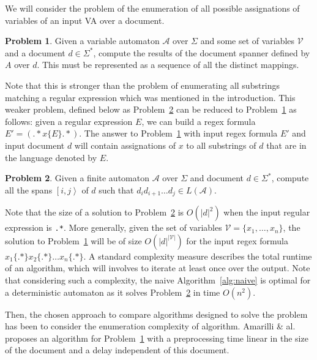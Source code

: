 \documentclass[12px]{article}
\theoremstyle{definition}
\newtheorem{problem}{Problem}
\newcommand{\Span}[1]{\left[ #1 \right\rangle}
\begin{document}

      We will consider the problem of the enumeration of all possible
      assignations of variables of an input VA over a document.

      \begin{problem}%
        \label{pb:strong}
        Given a variable automaton $\mathcal{A}$ over $\Sigma$ and some set of
        variables $\mathcal{V}$ and a document $d \in \Sigma^*$, compute the
        results of the document spanner defined by $A$ over $d$. This must be
        represented as a sequence of all the distinct mappings.
      \end{problem}

      Note that this is stronger than the problem of enumerating all substrings
      matching a regular expression which was mentioned in the introduction.
      This weaker problem, defined below as Problem~\ref{pb:weak} can be
      reduced to Problem~\ref{pb:strong} as follows: given a regular expression
      $E$, we can build a regex formula $E' = ({.}* x\{E\} {.}*)$. The answer
      to Problem~\ref{pb:strong} with input regex formula $E'$ and input
      document $d$ will contain assignations of $x$ to all substrings of $d$
      that are in the language denoted by $E$.

      \begin{problem}%
        \label{pb:weak}
        Given a finite automaton $\mathcal{A}$ over $\Sigma$ and document $d
        \in \Sigma^*$, compute all the spans $\Span{i, j}$ of $d$ such that
        $d_i d_{i+1} \ldots d_j \in L(\mathcal{A})$.
      \end{problem}

      Note that the size of a solution to Problem~\ref{pb:weak} is $O(|d|^2)$
      when the input regular expression is \texttt{.*}. More generally, given
      the set of variables $\mathcal{V} = \{x_1, \ldots, x_n\}$, the solution
      to Problem~\ref{pb:strong} will be of size $O(|d|^{|\mathcal{V}|})$ for
      the input regex formula \texttt{$x_1\{.*\} x_2\{.*\} \ldots x_n\{.*\}$}.
      A standard complexity measure describes the total runtime of an
      algorithm, which will involves to iterate at least once over the output.
      Note that considering such a complexity, the naive
      Algorithm~\ref{alg:naive} is optimal for a deterministic automaton as it
      solves Problem~\ref{pb:weak} in time $O(n^2)$.

      Then, the chosen approach to compare algorithms designed to solve the
      problem has been to consider the enumeration complexity of algorithm.
      Amarilli \& al.~\cite{ICDT19} proposes an algorithm for
      Problem~\ref{pb:strong} with a preprocessing time linear in the size of
      the document and a delay independent of this document.
\end{document}
